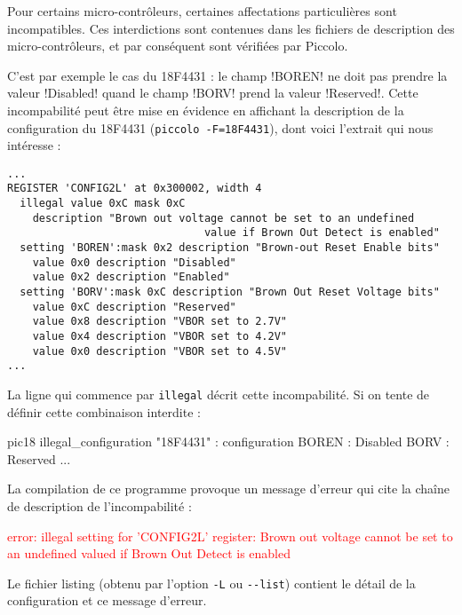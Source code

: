 Pour certains micro-contrôleurs, certaines affectations particulières sont incompatibles. Ces interdictions sont contenues dans les fichiers de description des micro-contrôleurs, et par conséquent sont vérifiées par Piccolo. 

C’est par exemple le cas du 18F4431 : le champ \pic!BOREN! ne doit pas prendre la valeur \pic!Disabled! quand le champ \pic!BORV! prend la valeur \pic!Reserved!. Cette incompabilité peut être mise en évidence en affichant la description de la configuration du 18F4431 (\texttt{piccolo -F=18F4431}), dont voici l'extrait qui nous intéresse :

\begin{lstlisting}[frame=l, language=assembleur]
...
REGISTER 'CONFIG2L' at 0x300002, width 4
  illegal value 0xC mask 0xC
    description "Brown out voltage cannot be set to an undefined 
                               value if Brown Out Detect is enabled"
  setting 'BOREN':mask 0x2 description "Brown-out Reset Enable bits"
    value 0x0 description "Disabled"
    value 0x2 description "Enabled"
  setting 'BORV':mask 0xC description "Brown Out Reset Voltage bits"
    value 0xC description "Reserved"
    value 0x8 description "VBOR set to 2.7V"
    value 0x4 description "VBOR set to 4.2V"
    value 0x0 description "VBOR set to 4.5V"
...
\end{lstlisting}


La ligne qui commence par \texttt{illegal} décrit cette incompabilité. Si on tente de définir cette combinaison interdite :
\begin{piccolo}
pic18 illegal_configuration "18F4431" :
configuration {
  BOREN : Disabled
  BORV : Reserved
  ...
}
\end{piccolo}

La compilation de ce programme provoque un message d’erreur qui cite la chaîne de description de l'incompabilité :


\textcolor{red}{error: illegal setting for 'CONFIG2L' register: Brown out voltage cannot be set to an undefined valued if Brown Out Detect is enabled}

Le fichier listing (obtenu par l’option \texttt{-L} ou \texttt{-{}-list}) contient le détail de la configuration et ce message d’erreur.

